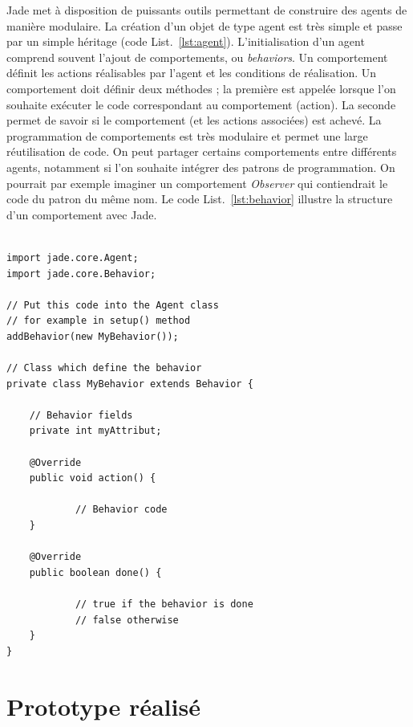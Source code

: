 \documentclass[conference]{IEEEtran}
\begin{document}
Jade met à disposition de puissants outils permettant de construire des agents de manière modulaire. La création d'un objet de type agent est très simple et passe par un simple héritage (code List.~\ref{lst:agent}). L'initialisation d'un agent comprend souvent l'ajout de comportements, ou \textit{behaviors}. Un comportement définit les actions réalisables par l'agent et les conditions de réalisation. Un comportement doit définir deux méthodes ; la première est appelée lorsque l'on souhaite exécuter le code correspondant au comportement (action). La seconde permet de savoir si le comportement (et les actions associées) est achevé. La programmation de comportements est très modulaire et permet une large réutilisation de code. On peut partager certains comportements entre différents agents, notamment si l'on souhaite intégrer des patrons de programmation. On pourrait par exemple imaginer un comportement \textit{Observer} qui contiendrait le code du patron du même nom. Le code List.~\ref{lst:behavior} illustre la structure d'un comportement avec Jade.\\

\begin{lstlisting}[caption=Agents et comportements, label=lst:behavior]

import jade.core.Agent;
import jade.core.Behavior;

// Put this code into the Agent class
// for example in setup() method
addBehavior(new MyBehavior());

// Class which define the behavior
private class MyBehavior extends Behavior {

    // Behavior fields
    private int myAttribut;
    
    @Override
    public void action() {
    
            // Behavior code
    }
    
    @Override
    public boolean done() {
    
            // true if the behavior is done
            // false otherwise
    }
}
\end{lstlisting}

\section{Prototype réalisé}
\end{document}
